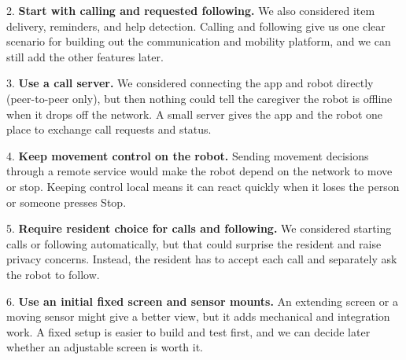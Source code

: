 \documentclass[12pt,letterpaper]{article}
\begin{document}
2. \textbf{Start with calling and requested following.} We also considered item delivery, reminders, and help detection. Calling and following give us one clear scenario for building out the communication and mobility platform, and we can still add the other features later.

3. \textbf{Use a call server.} We considered connecting the app and robot directly (peer-to-peer only), but then nothing could tell the caregiver the robot is offline when it drops off the network. A small server gives the app and the robot one place to exchange call requests and status.

4. \textbf{Keep movement control on the robot.} Sending movement decisions through a remote service would make the robot depend on the network to move or stop. Keeping control local means it can react quickly when it loses the person or someone presses Stop.

5. \textbf{Require resident choice for calls and following.} We considered starting calls or following automatically, but that could surprise the resident and raise privacy concerns. Instead, the resident has to accept each call and separately ask the robot to follow.

6. \textbf{Use an initial fixed screen and sensor mounts.} An extending screen or a moving sensor might give a better view, but it adds mechanical and integration work. A fixed setup is easier to build and test first, and we can decide later whether an adjustable screen is worth it.
\end{document}

